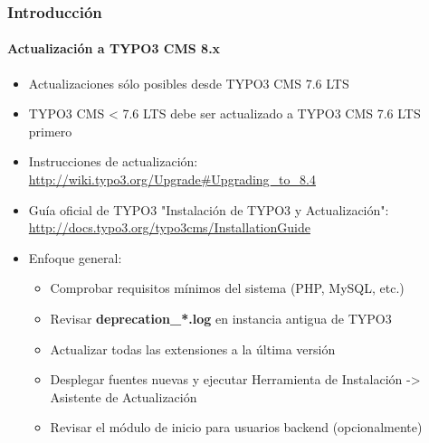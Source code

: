 \begin{frame}[fragile]
	\frametitle{Introducción}
	\framesubtitle{Actualización a TYPO3 CMS 8.x}

	\begin{itemize}
		\item Actualizaciones sólo posibles desde TYPO3 CMS 7.6 LTS
		\item TYPO3 CMS < 7.6 LTS debe ser actualizado a TYPO3 CMS 7.6 LTS primero
	\end{itemize}

	\begin{itemize}

		\item Instrucciones de actualización:\newline
			\smaller\url{http://wiki.typo3.org/Upgrade#Upgrading_to_8.4}\normalsize
		\item Guía oficial de TYPO3 "Instalación de TYPO3 y Actualización":
			\smaller\url{http://docs.typo3.org/typo3cms/InstallationGuide}\normalsize
		\item Enfoque general:
			\begin{itemize}
				\item Comprobar requisitos mínimos del sistema \small(PHP, MySQL, etc.)
				\item Revisar \textbf{deprecation\_*.log} en instancia antigua de TYPO3
				\item Actualizar todas las extensiones a la última versión
                \item Desplegar fuentes nuevas y ejecutar Herramienta de Instalación -> Asistente de Actualización
                \item Revisar el módulo de inicio para usuarios backend (opcionalmente)
			\end{itemize}
	\end{itemize}

\end{frame}


